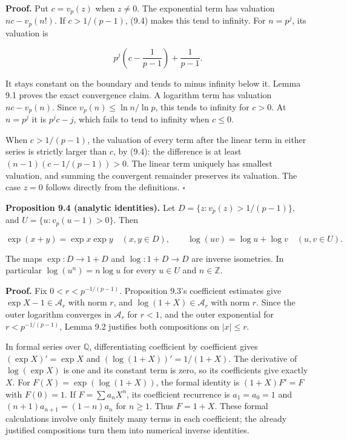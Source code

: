 \documentclass[
  11pt,
  a4paper,
]{article}
\begin{document}
\textbf{Proof.} Put \(c=v_p(z)\) when \(z\ne0\). The exponential term
has valuation \(nc-v_p(n!)\). If \(c>1/(p-1)\), (9.4) makes this tend to
infinity. For \(n=p^j\), its valuation is

\[
p^j\left(c-\frac1{p-1}\right)+\frac1{p-1}.
\]

It stays constant on the boundary and tends to minus infinity below it.
Lemma 9.1 proves the exact convergence claim. A logarithm term has
valuation \(nc-v_p(n)\). Since \(v_p(n)\le\ln n/\ln p\), this tends to
infinity for \(c>0\). At \(n=p^j\) it is \(p^jc-j\), which fails to tend
to infinity when \(c\le0\).

When \(c>1/(p-1)\), the valuation of every term after the linear term in
either series is strictly larger than \(c\), by (9.4): the difference is
at least \((n-1)(c-1/(p-1))>0\). The linear term uniquely has smallest
valuation, and summing the convergent remainder preserves its valuation.
The case \(z=0\) follows directly from the definitions. \(\square\)

\textbf{Proposition 9.4 (analytic identities).} Let
\(D=\{z:v_p(z)>1/(p-1)\}\), and \(U=\{u:v_p(u-1)>0\}\). Then

\[
\exp(x+y)=\exp x\exp y\quad(x,y\in D),
\qquad
\log(uv)=\log u+\log v\quad(u,v\in U).
\tag{9.8}
\]

The maps \(\exp:D\to1+D\) and \(\log:1+D\to D\) are inverse isometries.
In particular \(\log(u^n)=n\log u\) for every \(u\in U\) and
\(n\in\mathbb Z\).

\textbf{Proof.} Fix \(0<r<p^{-1/(p-1)}\). Proposition 9.3's coefficient
estimates give \(\exp X-1\in\mathcal A_r\) with norm \(r\), and
\(\log(1+X)\in\mathcal A_r\) with norm \(r\). Since the outer logarithm
converges in \(\mathcal A_r\) for \(r<1\), and the outer exponential for
\(r<p^{-1/(p-1)}\), Lemma 9.2 justifies both compositions on
\(|x|\le r\).

In formal series over \(\mathbb Q\), differentiating coefficient by
coefficient gives \((\exp X)'=\exp X\) and \((\log(1+X))'=1/(1+X)\). The
derivative of \(\log(\exp X)\) is one and its constant term is zero, so
its coefficients give exactly \(X\). For \(F(X)=\exp(\log(1+X))\), the
formal identity is \((1+X)F'=F\) with \(F(0)=1\). If \(F=\sum a_nX^n\),
its coefficient recurrence is \(a_1=a_0=1\) and
\((n+1)a_{n+1}=(1-n)a_n\) for \(n\ge1\). Thus \(F=1+X\). These formal
calculations involve only finitely many terms in each coefficient; the
already justified compositions turn them into numerical inverse
identities.
\end{document}
